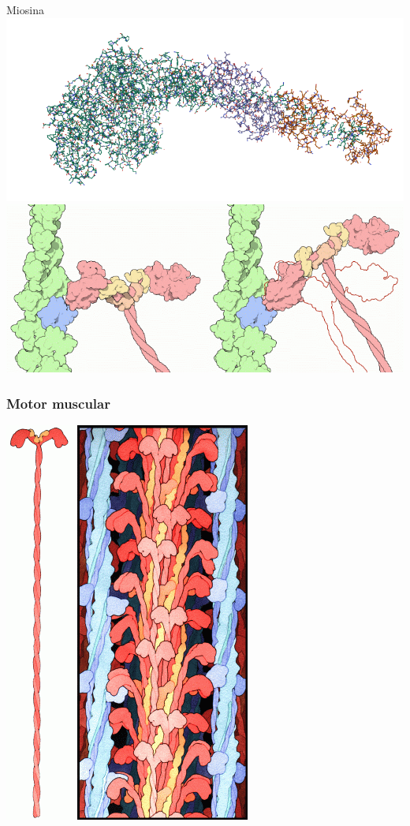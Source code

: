 \documentclass[10pt]{beamer}
\theoremstyle{plain}
\theoremstyle{definition}
\begin{document}
\begin{frame}
{\begin{center}
\begin{minipage}{0.3\linewidth}
				\end{minipage}
				\begin{minipage}{0.08\linewidth}
					\hspace{0.2cm}
				\end{minipage}
				\begin{minipage}{0.5\linewidth}
					\centering Miosina\\
					\includegraphics[width=1\linewidth]{1B7T.png}\\
					\includegraphics[width=1\linewidth]{powerstroke.png}
				\end{minipage}
			\end{center}
			
		}	
	\end{frame}

	\begin{frame}
		\frametitle{\normalsize Motor muscular } 
		{
			\small
			\begin{center}
				\includegraphics[width=0.4\linewidth]{myosin-painting.png}	
			\end{center}
			
		}	
	\end{frame}
	
\end{document}
